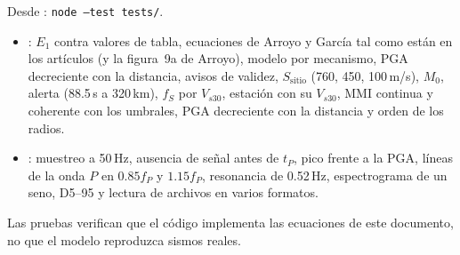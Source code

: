 \documentclass[11pt,a4paper]{article}
\begin{document}
Desde : \texttt{node --test tests/}.
\begin{itemize}
  \item {}: $E_1$ contra valores de tabla, ecuaciones de Arroyo y García
        tal como están en los artículos (y la figura~9a de Arroyo), modelo por mecanismo, PGA decreciente
        con la distancia, avisos de validez, $S_{\mathrm{sitio}}$ (760, 450, 100\,m/s), $M_0$, alerta
        (88.5\,s a 320\,km),
        $f_S$ por $V_{s30}$, estación con su $V_{s30}$, MMI continua y coherente con los umbrales, PGA
        decreciente con la distancia y orden de los radios.
  \item {}: muestreo a 50\,Hz, ausencia de señal antes de $t_P$, pico
        frente a la PGA, líneas de la onda $P$ en $0.85f_P$ y $1.15f_P$, resonancia de 0.52\,Hz,
        espectrograma de un seno, D5--95 y lectura de archivos en varios formatos.
\end{itemize}
Las pruebas verifican que el código implementa las ecuaciones de este documento, no que el modelo
reproduzca sismos reales.
\end{document}
